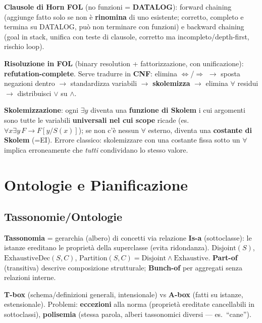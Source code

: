 \documentclass[10pt,a4paper]{article}
\begin{document}
\textbf{Clausole di Horn FOL} (no funzioni = \textbf{DATALOG}): forward chaining (aggiunge fatto solo se non è \textbf{rinomina} di uno esistente; corretto, completo e termina su DATALOG, può non terminare con funzioni) e backward chaining (goal in stack, unifica con teste di clausole, corretto ma incompleto/depth-first, rischio loop).

\textbf{Risoluzione in FOL} (binary resolution + fattorizzazione, con unificazione): \textbf{refutation-complete}. Serve tradurre in \textbf{CNF}: elimina $\Leftrightarrow$/$\Rightarrow$ $\to$ sposta negazioni dentro $\to$ standardizza variabili $\to$ \textbf{skolemizza} $\to$ elimina $\forall$ residui $\to$ distribuisci $\vee$ su $\wedge$.

\textbf{Skolemizzazione}: ogni $\exists y$ diventa una \textbf{funzione di Skolem} i cui argomenti sono tutte le variabili \textbf{universali nel cui scope} ricade (es.\ $\forall x\exists y\, F \to F[y/S(x)]$); se non c'è nessun $\forall$ esterno, diventa una \textbf{costante di Skolem} (=EI). Errore classico: skolemizzare con una costante fissa sotto un $\forall$ implica erroneamente che \emph{tutti} condividano lo stesso valore.

\section{Ontologie e Pianificazione}

\subsection{Tassonomie/Ontologie}

\textbf{Tassonomia} = gerarchia (albero) di concetti via relazione \textbf{Is-a} (sottoclasse): le istanze ereditano le proprietà della superclasse (evita ridondanza). $\text{Disjoint}(S)$, $\text{ExhaustiveDec}(S,C)$, $\text{Partition}(S,C)=\text{Disjoint}\wedge\text{Exhaustive}$. \textbf{Part-of} (transitiva) descrive composizione strutturale; \textbf{Bunch-of} per aggregati senza relazioni interne.

\textbf{T-box} (schema/definizioni generali, intensionale) vs \textbf{A-box} (fatti su istanze, estensionale). Problemi: \textbf{eccezioni} alla norma (proprietà ereditate cancellabili in sottoclassi), \textbf{polisemia} (stessa parola, alberi tassonomici diversi --- es.\ ``cane'').
\end{document}
